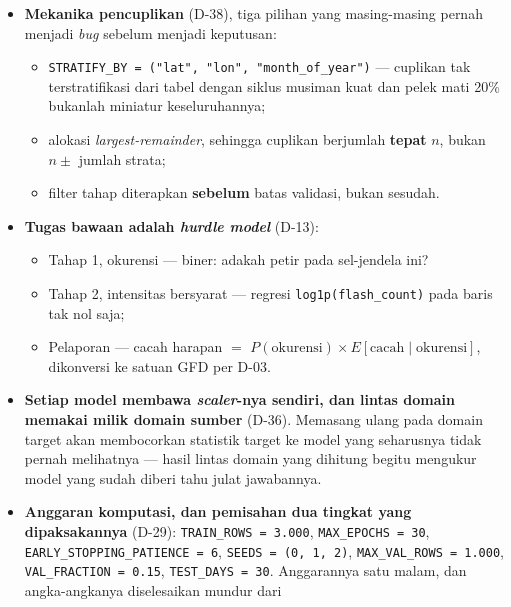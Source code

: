 \begin{itemize}
          75\% / 50\%) adalah satu sumbu OFAT.
    \item \textbf{Mekanika pencuplikan} (D-38), tiga pilihan yang masing-masing
          pernah menjadi \textit{bug} sebelum menjadi keputusan:
          \begin{itemize}
              \item \texttt{STRATIFY\_BY = ("lat", "lon", "month\_of\_year")} ---
                    cuplikan tak terstratifikasi dari tabel dengan siklus musiman
                    kuat dan pelek mati 20\% bukanlah miniatur keseluruhannya;
              \item alokasi \textit{largest-remainder}, sehingga cuplikan
                    berjumlah \textbf{tepat} $n$, bukan $n \pm$ jumlah strata;
              \item filter tahap diterapkan \textbf{sebelum} batas validasi,
                    bukan sesudah.
          \end{itemize}
    \item \textbf{Tugas bawaan adalah \textit{hurdle model}} (D-13):
          \begin{itemize}
              \item Tahap 1, okurensi --- biner: adakah petir pada sel-jendela
                    ini?
              \item Tahap 2, intensitas bersyarat --- regresi
                    \texttt{log1p(flash\_count)} pada baris tak nol saja;
              \item Pelaporan --- cacah harapan $=$
                    $P(\text{okurensi}) \times E[\text{cacah} \mid \text{okurensi}]$,
                    dikonversi ke satuan GFD per D-03.
          \end{itemize}
    \item \textbf{Setiap model membawa \textit{scaler}-nya sendiri, dan lintas
          domain memakai milik domain sumber} (D-36). Memasang ulang pada domain
          target akan membocorkan statistik target ke model yang seharusnya tidak
          pernah melihatnya --- hasil lintas domain yang dihitung begitu mengukur
          model yang sudah diberi tahu julat jawabannya.
    \item \textbf{Anggaran komputasi, dan pemisahan dua tingkat yang
          dipaksakannya} (D-29): \texttt{TRAIN\_ROWS = 3.000},
          \texttt{MAX\_EPOCHS = 30}, \texttt{EARLY\_STOPPING\_PATIENCE = 6},
          \texttt{SEEDS = (0, 1, 2)}, \texttt{MAX\_VAL\_ROWS = 1.000},
          \texttt{VAL\_FRACTION = 0.15}, \texttt{TEST\_DAYS = 30}.
          Anggarannya satu malam, dan angka-angkanya diselesaikan mundur dari

\end{itemize}
